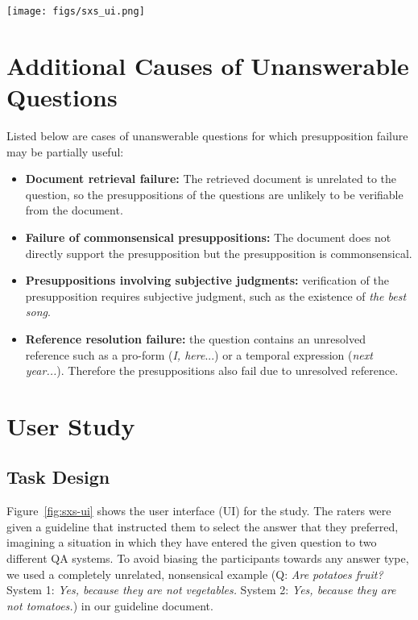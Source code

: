 \documentclass[11pt,a4paper]{article}
\begin{document}




\appendix

\begin{figure*}[t]
    \centering
    \texttt{[image: figs/sxs\_ui.png]}
    \caption{The user interface for the user preference study.}
    \label{fig:sxs-ui}
\end{figure*}

\section{Additional Causes of Unanswerable Questions}
\label{app:partially-useful-failures}

\noindent Listed below are cases of unanswerable questions for which presupposition failure may be partially useful:

\begin{itemize}
\itemsep -2pt
    \item \textbf{Document retrieval failure:} The retrieved document is unrelated to the question, so the presuppositions of the questions are unlikely to be verifiable from the document. 
    \item \textbf{Failure of commonsensical presuppositions:} The document does not directly support the presupposition but the presupposition is commonsensical.
    \item \textbf{Presuppositions involving subjective judgments:} verification of the presupposition requires subjective judgment, such as the existence of \textit{the best song}.
    \item \textbf{Reference resolution failure:} the question contains an unresolved reference such as a pro-form (\textit{I, here}...) or a temporal expression (\textit{next year...}). Therefore the presuppositions also fail due to unresolved reference.
\end{itemize}

\section{User Study}
\label{app:user-study}

\subsection{Task Design}
\label{app:sxs-task}
Figure~\ref{fig:sxs-ui} shows the user interface (UI) for the study. The raters were given a guideline that instructed them to select the answer that they preferred, imagining a situation in which they have entered the given question to two different QA systems. To avoid biasing the participants towards any answer type, we used a completely unrelated, nonsensical example (Q: \textit{Are potatoes fruit?} System 1: \textit{Yes, because they are not vegetables.} System 2: \textit{Yes, because they are not tomatoes.}) in our guideline document.  
\end{document}
